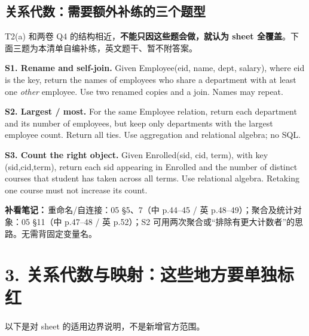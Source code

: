 \documentclass[11pt,a4paper]{article}
\begin{document}
\subsection{关系代数：需要额外补练的三个题型}
T2(a) 和两卷 Q4 的结构相近，\textbf{不能只因这些题会做，就认为 sheet 全覆盖}。下面三题为本清单自编补练，英文题干、暂不附答案。

\textbf{S1. Rename and self-join.} Given Employee(eid, name, dept, salary), where eid is the key, return the names of employees who share a department with at least one \emph{other} employee. Use two renamed copies and a join. Names may repeat.

\textbf{S2. Largest / most.} For the same Employee relation, return each department and its number of employees, but keep only departments with the largest employee count. Return all ties. Use aggregation and relational algebra; no SQL.

\textbf{S3. Count the right object.} Given Enrolled(sid, cid, term), with key (sid,cid,term), return each sid appearing in Enrolled and the number of distinct courses that student has taken across all terms. Use relational algebra. Retaking one course must not increase its count.

\textbf{补看笔记：}\,重命名/自连接：05 §5、7（中 p.44--45 / 英 p.48--49）；聚合及统计对象：05 §11（中 p.47--48 / 英 p.52）；S2 可用两次聚合或“排除有更大计数者”的思路。无需背固定变量名。

\clearpage
\section{3. 关系代数与映射：这些地方要单独标红}
以下是对 sheet 的适用边界说明，不是新增官方范围。
\end{document}
